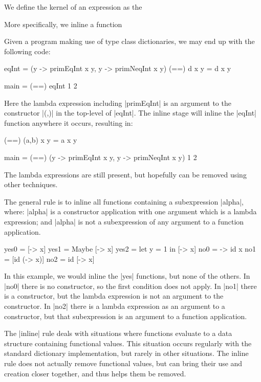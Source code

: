 \documentclass[preprint]{sigplanconf}
\begin{document}
We define the kernel of an expression as the 


More specifically, we inline a function 

\begin{example}
Given a program making use of type class dictionaries, we may end up with the following code:

\begin{code}
eqInt = (\x y -> primEqInt x y, \x y -> primNeqInt x y)
(==) d x y = d x y

main = (==) eqInt 1 2
\end{code}

Here the lambda expression including |primEqInt| is an argument to the constructor |(,)| in the top-level of |eqInt|. The inline stage will inline the |eqInt| function anywhere it occurs, resulting in:

\begin{code}
(==) (a,b) x y = a x y

main = (==) (\x y -> primEqInt x y, \x y -> primNeqInt x y) 1 2
\end{code}

The lambda expressions are still present, but hopefully can be removed using other techniques.
\end{example}

The general rule is to inline all functions containing a subexpression |alpha|, where: |alpha| is a constructor application with one argument which is a lambda expression; and |alpha| is not a subexpression of any argument to a function application.

\begin{example}
\begin{code}
yes0 = [\x -> x]
yes1 = Maybe [\x -> x]
yes2 = let y = 1 in [\x -> x]
no0 = \x -> id x
no1 = [id (\x -> x)]
no2 = id [\x -> x]
\end{code}

In this example, we would inline the |yes| functions, but none of the others. In |no0| there is no constructor, so the first condition does not apply. In |no1| there is a constructor, but the lambda expression is not an argument to the constructor. In |no2| there is a lambda expression as an argument to a constructor, but that subexpression is an argument to a function application.
\end{example}

The |inline| rule deals with situations where functions evaluate to a data structure containing functional values. This situation occurs regularly with the standard dictionary implementation, but rarely in other situations. The inline rule does not actually remove functional values, but can bring their use and creation closer together, and thus helps them be removed.
\end{document}
